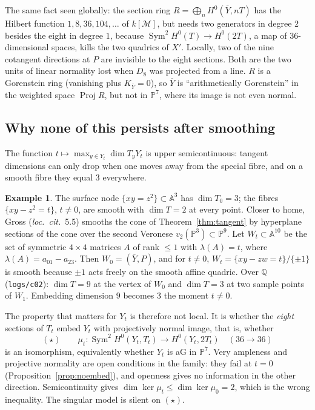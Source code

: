 \documentclass[10pt,a4paper]{article}
\theoremstyle{plain}
\theoremstyle{definition}
\newtheorem{example}[theorem]{Example}
\theoremstyle{remark}
\begin{document}
The same fact seen globally: the section ring
$R=\bigoplus_n H^0(\overline{Y},nT)$ has the Hilbert function
$1,8,36,104,\dots$ of $k[\mathcal{M}]$, but needs two generators
in degree $2$ besides the eight in degree $1$, because
$\operatorname{Sym}^2H^0(T)\to H^0(2T)$, a map of $36$-dimensional
spaces, kills the two quadrics of $X'$. Locally, two of the nine
cotangent directions at $P$ are invisible to the eight sections.
Both are the two units of linear normality lost when $D_8$ was
projected from a line. $R$ is a Gorenstein ring (vanishing plus
$K_{\overline{Y}}=0$), so $\overline{Y}$ is ``arithmetically
Gorenstein'' in the weighted space $\operatorname{Proj}R$, but not
in $\mathbb{P}^7$, where its image is not even normal.

\subsection*{Why none of this persists after smoothing}
The function $t\mapsto\max_{y\in Y_t}\dim T_yY_t$ is upper
semicontinuous: tangent dimensions can only drop when one moves
away from the special fibre, and on a smooth fibre they equal $3$
everywhere.

\begin{example}
The surface node $\{xy=z^2\}\subset\mathbb{A}^3$ has
$\dim T_0=3$; the fibres $\{xy-z^2=t\}$, $t\ne 0$, are smooth with
$\dim T=2$ at every point. Closer to home, Gross (\emph{loc.\
cit.}~5.5) smooths the cone of Theorem~\ref{thm:tangent} by
hyperplane sections of the cone over the second Veronese
$v_2(\mathbb{P}^3)\subset\mathbb{P}^9$. Let $W_t\subset\mathbb{A}^{10}$
be the set of symmetric $4\times 4$ matrices $A$ of rank $\le 1$
with $\lambda(A)=t$, where $\lambda(A)=a_{01}-a_{23}$. Then
$W_0=(\overline{Y},P)$, and for $t\ne 0$, $W_t=\{xy-zw=t\}/\{\pm1\}$
is smooth because $\pm1$ acts freely on the smooth affine quadric.
Over $\mathbb{Q}$ (\texttt{logs/c02}): $\dim T=9$ at the vertex of
$W_0$ and $\dim T=3$ at two sample points of $W_1$. Embedding
dimension $9$ becomes $3$ the moment $t\ne 0$.
\end{example}

The property that matters for $Y_t$ is therefore not local. It is
whether the \emph{eight} sections of $T_t$ embed $Y_t$ with
projectively normal image, that is, whether
$$
(\star)\qquad
\mu_t:\operatorname{Sym}^2H^0(Y_t,T_t)\longrightarrow H^0(Y_t,2T_t)
\quad(36\to 36)
$$
is an isomorphism, equivalently whether $Y_t$ is aG in
$\mathbb{P}^7$. Very ampleness and projective normality are open
conditions in the family: they fail at $t=0$ (Proposition~\ref{prop:noembed}),
and openness gives no information in the other direction.
Semicontinuity gives $\dim\ker\mu_t\le\dim\ker\mu_0=2$, which is
the wrong inequality. The singular model is silent on $(\star)$.
\end{document}
